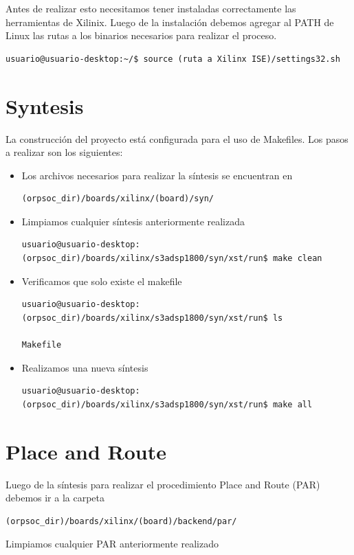 Antes de realizar esto necesitamos tener instaladas correctamente las herramientas de Xilinix. Luego de la instalación debemos agregar al PATH de Linux las rutas a los binarios necesarios para realizar el proceso. 

\begin{lstlisting}[breaklines]
 usuario@usuario-desktop:~/$ source (ruta a Xilinx ISE)/settings32.sh  
\end{lstlisting}

 \section{Syntesis}
La construcción del proyecto está configurada para el uso de Makefiles. Los pasos a realizar son los siguientes:

\begin{itemize}
\item Los archivos necesarios para realizar la síntesis se encuentran en 

\begin{lstlisting}[breaklines]
(orpsoc_dir)/boards/xilinx/(board)/syn/
\end{lstlisting}

\item Limpiamos cualquier síntesis anteriormente realizada 
\begin{lstlisting}[breaklines]
usuario@usuario-desktop:(orpsoc_dir)/boards/xilinx/s3adsp1800/syn/xst/run$ make clean
\end{lstlisting}

\item Verificamos que solo existe el makefile
\begin{lstlisting}[breaklines]
usuario@usuario-desktop:(orpsoc_dir)/boards/xilinx/s3adsp1800/syn/xst/run$ ls

Makefile
\end{lstlisting}

\item Realizamos una nueva síntesis
\begin{lstlisting}[breaklines]
usuario@usuario-desktop:(orpsoc_dir)/boards/xilinx/s3adsp1800/syn/xst/run$ make all
\end{lstlisting}

\end{itemize} 


\section{Place and Route}
Luego de la síntesis para realizar el procedimiento Place and Route (PAR) debemos ir a la carpeta
\begin{lstlisting}[breaklines]
(orpsoc_dir)/boards/xilinx/(board)/backend/par/
\end{lstlisting}
Limpiamos cualquier PAR anteriormente realizado

